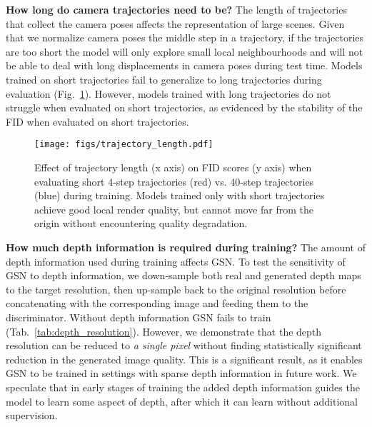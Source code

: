 \documentclass[10pt,twocolumn,letterpaper]{article}
\begin{document}
\textbf{How long do camera trajectories need to be?} The length of trajectories that collect the camera poses affects the representation of large scenes. Given that we normalize camera poses \wrt the middle step in a trajectory, if the trajectories are too short the model will only explore small local neighbourhoods and will not be able to deal with long displacements in camera poses during test time. Models trained on short trajectories fail to generalize to long trajectories during evaluation (Fig.~\ref{fig:trajectory_length}). However, models trained with long trajectories do not struggle when evaluated on short trajectories, as evidenced by the stability of the FID when evaluated on short trajectories.

\begin{figure}[h]
    \centering
    \texttt{[image: figs/trajectory\_length.pdf]}
    \caption{Effect of trajectory length (x axis) on FID scores (y axis) when evaluating short 4-step trajectories (red) vs. 40-step trajectories (blue) during training. Models trained only with short trajectories achieve good local render quality, but cannot move far from the origin without encountering quality degradation.}
    \label{fig:trajectory_length}
\end{figure}

\textbf{How much depth information is required during training?} The amount of depth information used during training affects GSN. To test the sensitivity of GSN to depth information, we down-sample both real and generated depth maps to the target resolution, then up-sample back to the original resolution before concatenating with the corresponding image and feeding them to the discriminator. Without depth information GSN fails to train (Tab.~\ref{tab:depth_resolution}). However, we demonstrate that the depth resolution can be reduced to \textit{a single pixel} without finding statistically significant reduction in the generated image quality. This is a significant  result, as it enables GSN to be trained in settings with sparse depth information in future work. We speculate that in early stages of training the added depth information guides the model to learn some aspect of depth, after which it can learn without additional supervision. 
\end{document}

